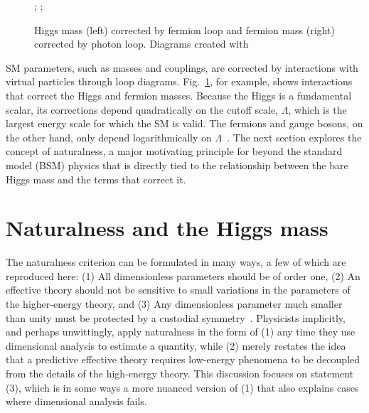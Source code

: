 \documentclass[12pt]{article}
\begin{document}
    \noindent \begin{figure}[htbp] \begin{center}
        ;
        \qquad
        ;
        \caption{Higgs mass (left) corrected by fermion loop and fermion mass (right) corrected by photon loop. Diagrams created with~\cite{tikz}}
        \label{loop_diagrams}
    \end{center} \end{figure}

    SM parameters, such as masses and couplings, are corrected by interactions with virtual particles through loop diagrams. Fig.~\ref{loop_diagrams}, for example, shows interactions that correct the Higgs and fermion masses. Because the Higgs is a fundamental scalar, its corrections depend quadratically on the cutoff scale, $\Lambda$, which is the largest energy scale for which the SM is valid. The fermions and gauge bosons, on the other hand, only depend logarithmically on $\Lambda$~\cite{dine_naturalness}. The next section explores the concept of naturalness, a major motivating principle for beyond the standard model (BSM) physics that is directly tied to the relationship between the bare Higgs mass and the terms that correct it.

\section{Naturalness and the Higgs mass}
    The naturalness criterion can be formulated in many ways, a few of which are reproduced here: (1) All dimensionless parameters should be of order one, (2) An effective theory should not be sensitive to small variations in the parameters of the higher-energy theory, and (3) Any dimensionless parameter much smaller than unity must be protected by a custodial symmetry~\cite{giudice_naturally, thooft_naturalness}. Physicists implicitly, and perhaps unwittingly, apply naturalness in the form of (1) any time they use dimensional analysis to estimate a quantity, while (2) merely restates the idea that a predictive effective theory requires low-energy phenomena to be decoupled from the details of the high-energy theory. This discussion focuses on statement (3), which is in some ways a more nuanced version of (1) that also explains cases where dimensional analysis fails.
\end{document}
